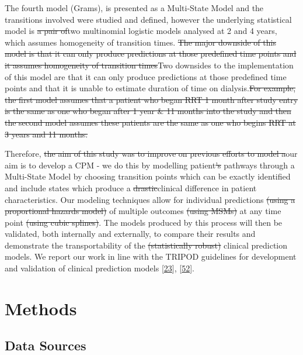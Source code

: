 \documentclass[
]{article}
\begin{document}
The fourth model (Grams), is presented as a Multi-State Model and the transitions involved were studied and defined, however the underlying statistical model is \sout{a pair of}two multinomial logistic models analysed at 2 and 4 years, which assumes homogeneity of transition times. \sout{The major downside of this model is that it can only produce predictions at those predefined time points and it assumes homogeneity of transition times}Two downsides to the implementation of this model are that it can only produce predictions at those predefined time points and that it is unable to estimate duration of time on dialysis.\sout{For example, the first model assumes that a patient who began RRT 1 month after study entry is the same as one who began after 1 year \& 11 months into the study and then the second model assumes these patients are the same as one who begins RRT at 3 years and 11 months.}

Therefore, \sout{the aim of this study was to improve on previous efforts to model a}our aim is to develop a CPM - we do this by modelling patient\sout{'s} pathways through a Multi-State Model by choosing transition points which can be exactly identified and include states which produce a \sout{drastic}clinical difference in patient characteristics. Our modeling techniques allow for individual predictions \sout{(using a proportional hazards model)} of multiple outcomes \sout{(using MSMs)} at any time point \sout{(using cubic splines)}. The models produced by this process will then be validated, both internally and externally, to compare their results and demonstrate the transportability of the \sout{(statistically robust)} clinical prediction models. We report our work in line with the TRIPOD guidelines for development and validation of clinical prediction models {[}\protect\hyperlink{ref-collins_transparent_2015}{23}{]}, {[}\protect\hyperlink{ref-moons_transparent_2015}{52}{]}.

\hypertarget{methods-1}{%
\section{Methods}\label{methods-1}}

\hypertarget{data-sources}{%
\subsection{Data Sources}\label{data-sources}}
\end{document}
